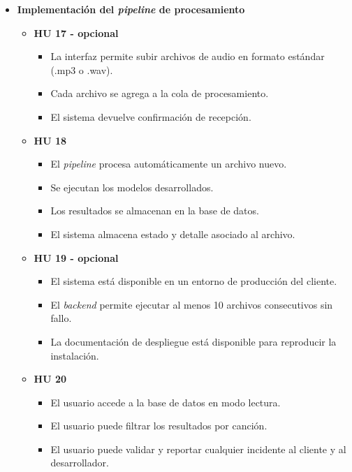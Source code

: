 \documentclass[
11pt, %
]{charter}
\begin{document}
\begin{itemize}
  \item \textbf{Implementación del  \textit{pipeline} de procesamiento}
    \begin{itemize}
      \item \textbf{HU 17 - opcional}
      \begin{itemize}
        \item La interfaz permite subir archivos de audio en formato estándar (.mp3 o .wav).
        \item Cada archivo se agrega a la cola de procesamiento.
        \item El sistema devuelve confirmación de recepción.
      \end{itemize}
      \item \textbf{HU 18}
        \begin{itemize}
        \item El \textit{pipeline} procesa automáticamente un archivo nuevo.
        \item Se ejecutan los modelos desarrollados.
        \item Los resultados se almacenan en la base de datos.
        \item El sistema almacena estado y detalle asociado al archivo.
        \end{itemize}
      \item \textbf{HU 19 - opcional}
      \begin{itemize}
        \item El sistema está disponible en un entorno de producción del cliente.
        \item El \textit{backend} permite ejecutar al menos 10 archivos consecutivos sin fallo.
        \item La documentación de despliegue está disponible para reproducir la instalación.
      \end{itemize}
      \item \textbf{HU 20}
      \begin{itemize}
        \item El usuario accede a la base de datos en modo lectura.
        \item El usuario puede filtrar los resultados por canción.
        \item El usuario puede validar y reportar cualquier incidente al cliente y al desarrollador.
      \end{itemize}
    \end{itemize}

\end{itemize}
\end{document}
